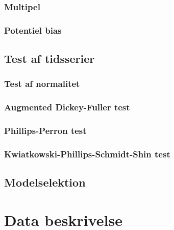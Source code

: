 \documentclass[
  a4paper,
  oneside]{memoir}
\begin{document}
\hypertarget{multipel}{%
\subsection{Multipel}\label{multipel}}

\hypertarget{potentiel-bias}{%
\subsection{Potentiel bias}\label{potentiel-bias}}

\hypertarget{test-af-tidsserier}{%
\section{Test af tidsserier}\label{test-af-tidsserier}}

\hypertarget{test-af-normalitet}{%
\subsection{Test af normalitet}\label{test-af-normalitet}}

\hypertarget{augmented-dickey-fuller-test}{%
\subsection{Augmented Dickey-Fuller test}\label{augmented-dickey-fuller-test}}

\hypertarget{phillips-perron-test}{%
\subsection{Phillips-Perron test}\label{phillips-perron-test}}

\hypertarget{kwiatkowski-phillips-schmidt-shin-test}{%
\subsection{Kwiatkowski-Phillips-Schmidt-Shin test}\label{kwiatkowski-phillips-schmidt-shin-test}}

\hypertarget{modelselektion}{%
\section{Modelselektion}\label{modelselektion}}

\hypertarget{data-beskrivelse}{%
\chapter{Data beskrivelse}\label{data-beskrivelse}}
\end{document}
